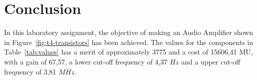 \section{Conclusion}
\label{sec:conclusion}

In this laboratory assignment, the objective of making an Audio Amplifier shown in
Figure~\ref{fig:t4-transistors} has been achieved.
The values for the components in Table~\ref{tab:values} has a merit of approximately 3775
and a cost of 15606,41 MU, with a gain of 67,57, a lower cut-off frequency of 4,37 $Hz$ and a upper cut-off
frequency of 3,81 $MHz$.
